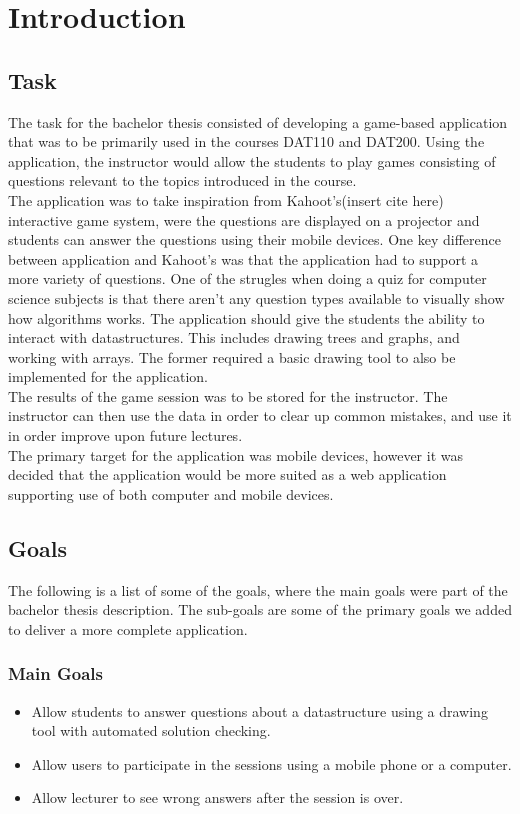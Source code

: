 \section{Introduction}
\subsection{Task}
The task for the bachelor thesis consisted of developing a game-based application that was to be primarily used in the courses DAT110 and DAT200. Using the application, the instructor would allow the students to play games consisting of questions relevant to the topics introduced in the course.
\\[11pt]
The application was to take inspiration from Kahoot's(insert cite here) interactive game system, were the questions are displayed on a projector and students can answer the questions using their mobile devices. One key difference between application and Kahoot's was that the application had to support a more variety of questions. One of the strugles when doing a quiz for computer science subjects is that there aren't any question types available to visually show how algorithms works. The application should give the students the ability to interact with datastructures. This includes drawing trees and graphs, and working with arrays. The former required a basic drawing tool to also be implemented for the application.
\\[11pt] 
The results of the game session was to be stored for the instructor. The instructor can then use the data in order to clear up common mistakes, and use it in order improve upon future lectures.
\\[11pt]
The primary target for the application was mobile devices, however it was decided that the application would be more suited as a web application supporting use of both computer and mobile devices. 

\subsection{Goals}
The following is a list of some of the goals, where the main goals were part of the bachelor thesis description. The sub-goals are some of the primary goals we added to deliver a more complete application.
\subsubsection{Main Goals}
\begin{itemize}
\item Allow students to answer questions about a datastructure using a drawing tool with automated solution checking.
\item Allow users to participate in the sessions using a mobile phone or a computer.
\item Allow lecturer to see wrong answers after the session is over.
\end{itemize}
